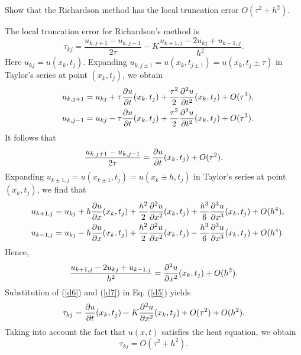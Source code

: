  
\begin{problem} Show that the Richardson method
has the local truncation error $O(\tau^{2}+h^{2})$.
\end{problem}
\begin{solution}
The local truncation error for Richardson's
method is
\begin{equation}
\tau_{kj}=\frac{u_{k,j+1}-u_{k,j-1}}{2\tau}-K \frac{u_{k+1,
j}-2u_{kj}+u_{k-1,j}}{h^{2}}. \label{d5}
\end{equation}
Here $u_{kj}=u(x_{k},t_{j})$. Expanding $u_{k,j\pm
1}=u(x_{k},t_{j\pm 1})=u(x_{k},t_{j}\pm \tau)$ in Taylor's series at
point $(x_{k},t_{j})$, we obtain
\begin{eqnarray}
&&u_{k,j+1}=u_{kj}+\tau \frac{{\partial} u}{{\partial} t}(x_k,t_j)+
\frac{\tau^2}{2}\frac{{\partial}^2 u}{{\partial} t^2}(x_k,t_j)+O(\tau^3),   \nonumber \\
&&u_{k,j-1}=u_{kj}-\tau \frac{{\partial} u}{{\partial} t}(x_k,t_j)+
\frac{\tau^2}{2}\frac{{\partial}^2 u}{{\partial} t^2}(x_k,t_j)+O(\tau^3).
\nonumber
\end{eqnarray}
It follows that
\begin{equation}
\frac{u_{k,j+1}-u_{k,j-1}}{2\tau}=\frac{{\partial} u}{{\partial}
t}(x_k,t_j)+O(\tau^2). \label{d6}
\end{equation}
Expanding $u_{k\pm 1,j}=u(x_{k\pm 1},t_j)=u(x_{k}\pm h,t_{j})$ in
Taylor's series at point $(x_{k},t_{j})$, we find that
\begin{eqnarray}
&&u_{k+1,j}=u_{kj}+h \frac{{\partial} u}{{\partial} x}(x_k,t_j)+
\frac{h^2}{2}\frac{{\partial}^2 u}{{\partial} x^2}(x_k,t_j)+
\frac{h^3}{6}\frac{{\partial}^3 u}{{\partial} x^3}(x_k,t_j)+O(h^4),   \nonumber \\
&&u_{k-1,j}=u_{kj}-h \frac{{\partial} u}{{\partial} x}(x_k,t_j)+
\frac{h^2}{2}\frac{{\partial}^2 u}{{\partial} x^2}(x_k,t_j)-
\frac{h^3}{6}\frac{{\partial}^3 u}{{\partial} x^3}(x_k,t_j)+O(h^4).   \nonumber
\end{eqnarray}
Hence,
\begin{equation}
\frac{u_{k+1, j}-2u_{kj}+u_{k-1,j}}{h^{2}}= \frac{{\partial}^2 u}{{\partial}
x^2}(x_k,t_j)+O(h^2). \label{d7}
\end{equation}
Substitution of (\ref{d6}) and (\ref{d7}) in Eq. (\ref{d5}) yields
\[
\tau_{kj}=\frac{{\partial} u}{{\partial} t}(x_k,t_j)-K \frac{{\partial}^2 u}{{\partial}
x^2}(x_k,t_j) +O(\tau^2)+O(h^2).
\]
Taking into account the fact that $u(x,t)$ satisfies the heat equation,
we obtain
\[
\tau_{kj}=O(\tau^2+h^2).
\]
\end{solution}
 
